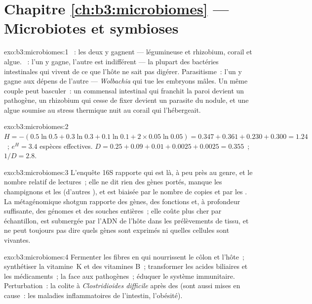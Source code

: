 \section*{Chapitre \ref{ch:b3:microbiomes} --- Microbiotes et symbioses}

\begin{solution}{exo:b3:microbiomes:1}
~: les deux y gagnent --- légumineuse et rhizobium, corail et
algue. ~: l'un y gagne, l'autre est indifférent --- la
plupart des bactéries intestinales qui vivent de ce que l'hôte ne sait
pas digérer. Parasitisme~: l'un y gagne aux dépens de l'autre ---
\emph{Wolbachia} qui tue les embryons mâles. Un même couple peut
basculer~: un commensal intestinal qui franchit la paroi devient un
pathogène, un rhizobium qui cesse de fixer devient un parasite du
nodule, et une algue soumise au stress thermique nuit au corail qui
l'hébergeait.
\end{solution}

\begin{solution}{exo:b3:microbiomes:2}
$H = -(0.5\ln 0.5 + 0.3\ln 0.3 + 0.1\ln 0.1 + 2\times 0.05\ln 0.05) =
0.347 + 0.361 + 0.230 + 0.300 = 1.24$~; $e^{H} = 3.4$ espèces
effectives. $D = 0.25 + 0.09 + 0.01 + 0.0025 + 0.0025 = 0.355$~; $1/D =
2.8$.
\end{solution}

\begin{solution}{exo:b3:microbiomes:3}
L'enquête 16S rapporte qui est là, à peu près au genre, et le nombre
relatif de lectures~; elle ne dit rien des gènes portés, manque les
champignons et les  (d'autres ), et est biaisée par le
nombre de copies et par les . La métagénomique shotgun rapporte
des gènes, des fonctions et, à profondeur suffisante, des génomes et
des souches entières~; elle coûte plus cher par échantillon, est
submergée par l'ADN de l'hôte dans les prélèvements de tissu, et ne
peut toujours pas dire quels gènes sont exprimés ni quelles cellules
sont vivantes.
\end{solution}

\begin{solution}{exo:b3:microbiomes:4}
Fermenter les fibres en  qui nourrissent le
côlon et l'hôte~; synthétiser la vitamine~K et des vitamines B~;
transformer les acides biliaires et les médicaments~; la  face aux pathogènes~; éduquer le système immunitaire.
Perturbation~: la colite à \emph{Clostridioides difficile} après des
 (sont aussi mises en cause~: les maladies inflammatoires
de l'intestin, l'obésité).
\end{solution}

